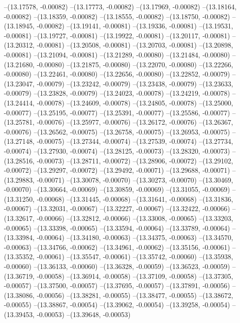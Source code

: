 --(13.17578, -0.00082)
--(13.17773, -0.00082)
--(13.17969, -0.00082)
--(13.18164, -0.00082)
--(13.18359, -0.00082)
--(13.18555, -0.00082)
--(13.18750, -0.00082)
--(13.18945, -0.00082)
--(13.19141, -0.00081)
--(13.19336, -0.00081)
--(13.19531, -0.00081)
--(13.19727, -0.00081)
--(13.19922, -0.00081)
--(13.20117, -0.00081)
--(13.20312, -0.00081)
--(13.20508, -0.00081)
--(13.20703, -0.00081)
--(13.20898, -0.00081)
--(13.21094, -0.00081)
--(13.21289, -0.00080)
--(13.21484, -0.00080)
--(13.21680, -0.00080)
--(13.21875, -0.00080)
--(13.22070, -0.00080)
--(13.22266, -0.00080)
--(13.22461, -0.00080)
--(13.22656, -0.00080)
--(13.22852, -0.00079)
--(13.23047, -0.00079)
--(13.23242, -0.00079)
--(13.23438, -0.00079)
--(13.23633, -0.00079)
--(13.23828, -0.00079)
--(13.24023, -0.00078)
--(13.24219, -0.00078)
--(13.24414, -0.00078)
--(13.24609, -0.00078)
--(13.24805, -0.00078)
--(13.25000, -0.00077)
--(13.25195, -0.00077)
--(13.25391, -0.00077)
--(13.25586, -0.00077)
--(13.25781, -0.00076)
--(13.25977, -0.00076)
--(13.26172, -0.00076)
--(13.26367, -0.00076)
--(13.26562, -0.00075)
--(13.26758, -0.00075)
--(13.26953, -0.00075)
--(13.27148, -0.00075)
--(13.27344, -0.00074)
--(13.27539, -0.00074)
--(13.27734, -0.00074)
--(13.27930, -0.00074)
--(13.28125, -0.00073)
--(13.28320, -0.00073)
--(13.28516, -0.00073)
--(13.28711, -0.00072)
--(13.28906, -0.00072)
--(13.29102, -0.00072)
--(13.29297, -0.00072)
--(13.29492, -0.00071)
--(13.29688, -0.00071)
--(13.29883, -0.00071)
--(13.30078, -0.00070)
--(13.30273, -0.00070)
--(13.30469, -0.00070)
--(13.30664, -0.00069)
--(13.30859, -0.00069)
--(13.31055, -0.00069)
--(13.31250, -0.00068)
--(13.31445, -0.00068)
--(13.31641, -0.00068)
--(13.31836, -0.00067)
--(13.32031, -0.00067)
--(13.32227, -0.00067)
--(13.32422, -0.00066)
--(13.32617, -0.00066)
--(13.32812, -0.00066)
--(13.33008, -0.00065)
--(13.33203, -0.00065)
--(13.33398, -0.00065)
--(13.33594, -0.00064)
--(13.33789, -0.00064)
--(13.33984, -0.00064)
--(13.34180, -0.00063)
--(13.34375, -0.00063)
--(13.34570, -0.00063)
--(13.34766, -0.00062)
--(13.34961, -0.00062)
--(13.35156, -0.00061)
--(13.35352, -0.00061)
--(13.35547, -0.00061)
--(13.35742, -0.00060)
--(13.35938, -0.00060)
--(13.36133, -0.00060)
--(13.36328, -0.00059)
--(13.36523, -0.00059)
--(13.36719, -0.00058)
--(13.36914, -0.00058)
--(13.37109, -0.00058)
--(13.37305, -0.00057)
--(13.37500, -0.00057)
--(13.37695, -0.00057)
--(13.37891, -0.00056)
--(13.38086, -0.00056)
--(13.38281, -0.00055)
--(13.38477, -0.00055)
--(13.38672, -0.00055)
--(13.38867, -0.00054)
--(13.39062, -0.00054)
--(13.39258, -0.00054)
--(13.39453, -0.00053)
--(13.39648, -0.00053)
